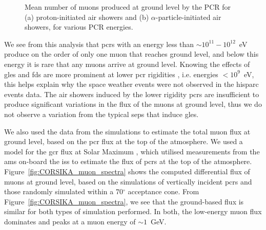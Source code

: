 \begin{figure}[ht!]
	\centering
	\qquad
	\caption{Mean number of muons produced at ground level by the PCR for (a) proton-initiated air showers and (b) $\alpha$-particle-initiated air showers, for various PCR energies.}
	\label{fig:shower_muons}
\end{figure}


We see from this analysis that \glspl{pcr} with an energy less than $\sim 10^{11}-10^{12}$~eV produce on the order of only one muon that reaches ground level, and below this energy it is rare that any muons arrive at ground level. Knowing the effects of \glspl{gle} and \glspl{fd} are more prominent at lower \gls{pcr} rigidities \citep{belov_solar_2005}, i.e. energies $<10^9$~eV, this helps explain why the space weather events were not observed in the \gls{hisparc} events data. The air showers induced by the lower rigidity \glspl{pcr} are insufficient to produce significant variations in the flux of the muons at ground level, thus we do not observe a variation from the typical \glspl{sep} that induce \glspl{gle}.

We also used the data from the simulations to estimate the total muon flux at ground level, based on the \gls{pcr} flux at the top of the atmosphere. We used a model for the \gls{gcr} flux at Solar Maximum \citep{corti_numerical_2019}, which utilised measurements from the \gls{ams} on-board the \gls{iss} to estimate the flux of \glspl{pcr} at the top of the atmosphere. Figure~\ref{fig:CORSIKA_muon_spectra} shows the computed differential flux of muons at ground level, based on the simulations of vertically incident \glspl{pcr} and those randomly simulated within a 70$^\circ$ acceptance cone. From Figure~\ref{fig:CORSIKA_muon_spectra}, we see that the ground-based flux is similar for both types of simulation performed. In both, the low-energy muon flux dominates and peaks at a muon energy of $\sim 1$~GeV.

